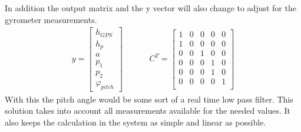   In addition the output matrix and the y vector will also change to adjust for the gyrometer measurements.
  \begin{align*}
   y = \begin{bmatrix}
        h_{GPS} \\
        h_p \\
        a \\
        p_1\\
        p_2\\
        \varphi_{pitch}
       \end{bmatrix}
       & \hspace{1cm}
       C^T = \begin{bmatrix}
        1 & 0 & 0 & 0 & 0 \\
        1 & 0 & 0 & 0 & 0 \\
        0 & 0 & 1 & 0 & 0 \\
        0 & 0 & 0 & 1 & 0 \\
        0 & 0 & 0 & 1 & 0 \\
        0 & 0 & 0 & 0 & 1 \\
        \end{bmatrix}
  \end{align*}
  With this the pitch angle would be some sort of a real time low pass filter.
  This solution takes into account all measurements available for the needed values.
  It also keeps the calculation in the system as simple and linear as possible.

